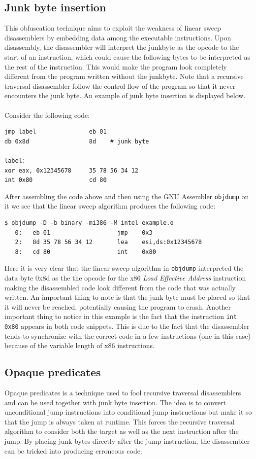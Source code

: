 \documentclass[11pt,twoside]{eitExjobb}
\begin{document}
\subsection{Junk byte insertion}
This obfuscation technique aims to exploit the weakness of linear sweep disassemblers by embedding data among the executable instructions. Upon disassembly, the disassembler will interpret the junkbyte as the opcode to the start of an instruction, which could cause the following bytes to be interpreted as the rest of the instruction. This would make the program look completely different from the program written without the junkbyte. Note that a recursive traversal disassembler follow the control flow of the program so that it never encounters the junk byte. An example of junk byte insertion is displayed below.\cite{instructionoverlapping}
\\
\\
Consider the following code:
\begin{verbatim}
jmp label               eb 01
db 0x8d                 8d    # junk byte

label:
xor eax, 0x12345678     35 78 56 34 12
int 0x80                cd 80
\end{verbatim}
\noindent After assembling the code above and then using the GNU Assembler \texttt{objdump}\cite{objdump} on it we see that the linear sweep algorithm produces the following code:

\begin{verbatim}
$ objdump -D -b binary -mi386 -M intel example.o
   0:	eb 01                	jmp    0x3
   2:	8d 35 78 56 34 12    	lea    esi,ds:0x12345678
   8:	cd 80                	int    0x80
\end{verbatim}

\noindent Here it is very clear that the linear sweep algorithm in \texttt{objdump} interpreted the data byte 0x8d as the the opcode for the x86 \emph{Load Effective Address} instruction making the disassembled code look different from the code that was actually written. An important thing to note is that the junk byte must be placed so that it will never be reached, potentially causing the program to crash. Another important thing to notice in this example is the fact that the instruction \texttt{int 0x80} appears in both code snippets. This is due to the fact that the disassembler tends to synchronize with the correct code in a few instructions (one in this case) because of the variable length of x86 instructions.  

\subsection{Opaque predicates}
Opaque predicates is a technique used to fool recursive traversal disassemblers and can be used together with junk byte insertion. The idea is to convert unconditional jump instructions into conditional jump instructions but make it so that the jump is always taken at runtime. This forces the recursive traversal algorithm to consider both the target as well as the next instruction after the jump. By placing junk bytes directly after the jump instruction, the disassembler can be tricked into producing erroneous code.\cite{instructionoverlapping}
\end{document}
